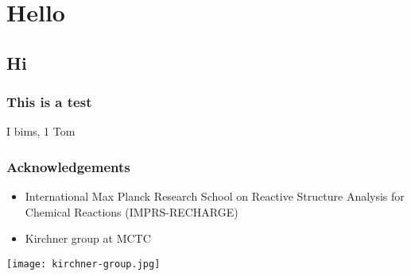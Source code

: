 \documentclass[t,]{beamer}
\begin{document}
%   
\section{Hello}
\subsection{Hi}

\begin{frame}
	\frametitle{This is a test}

	I bims, 1 Tom
\end{frame}

\begin{frame}
	\frametitle{Acknowledgements}

	\begin{itemize}
		\item International Max Planck Research School on Reactive Structure Analysis for Chemical Reactions (IMPRS-RECHARGE)
		\item Kirchner group at MCTC
	\end{itemize}


	\begin{center}
		\texttt{[image: kirchner-group.jpg]}
	\end{center}
\end{frame}
\end{document}
